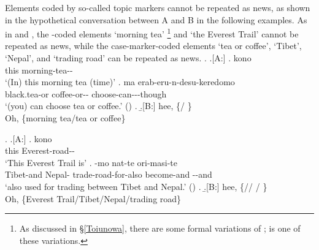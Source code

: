 Elements coded by so-called topic markers cannot be repeated as news, as shown in the hypothetical conversation between A and B in the following examples.
%
%		
As in \Next and \NNext,
the -coded elements
 `morning tea'%
	\footnote{
	As discussed in \S \ref{Toiunowa},
	there are some formal variations of ;
	 is one of these variations.
	}
and  `the Everest Trail'
cannot be repeated as news,
while the case-marker-coded elements  `tea or coffee',  `Tibet',  `Nepal', and  `trading road'
can be repeated as news.
%
	\ex. \a.[A:] \ag. kono  \\
			this morning-tea-- \\
			`(In) this morning tea (time)'
		\bg. ma   erab-eru-n-desu-keredomo \\
			 black.tea-or coffee-or-- choose-can---though \\
			`(you) can choose tea or coffee.'
			 \hfill{()}
		\z.	
	\b.[B:] hee, \{/ \}\\
			Oh, \{morning tea/tea or coffee\}
	

%
	\ex. \a.[A:] \ag. kono  \\
			this Everest-road-- \\
			`This Everest Trail is'
		\bg.   -mo nat-te ori-masi-te \\
			Tibet-and Nepal- trade-road-for-also  become-and \ab{plt}--and \\
			`also used for trading between Tibet and Nepal.'
			 \hfill{()}
		\z.
	\b.[B:] hee, \{// / \}\\
			Oh, \{Everest Trail/Tibet/Nepal/trading road\}
	

